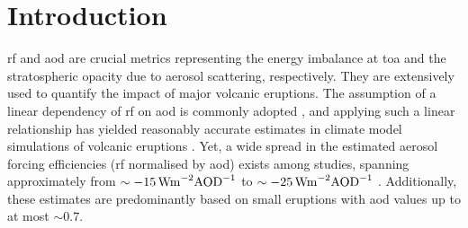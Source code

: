 \documentclass{ametsocV6.1}
\begin{document}

\section{Introduction}



\Gls{rf} and \gls{aod} are crucial metrics representing the energy imbalance at
\gls{toa} and the stratospheric opacity due to aerosol scattering, respectively. They
are extensively used to quantify the impact of major volcanic eruptions. The assumption
of a linear dependency of \gls{rf} on \gls{aod} is commonly adopted
\citep{myhre2013,andersson2015}, and applying such a linear relationship has yielded
reasonably accurate estimates in climate model simulations of volcanic eruptions
\citep{mills2017,hansen2005,gregory2016,marshall2020,pitari2016b}. Yet, a wide spread in
the estimated aerosol forcing efficiencies (\gls{rf} normalised by \gls{aod}) exists
among studies, spanning approximately from \(\sim
\SI{-15}{\watt\metre^{-2}\ce{AOD}^{-1}}\) \citep{pitari2016b} to \(\sim
\SI{-25}{\watt\metre^{-2}\ce{AOD}^{-1}}\) \citep{myhre2013}. Additionally, these
estimates are predominantly based on small eruptions with \gls{aod} values up to at most
\(\sim 0.7\).
\end{document}
